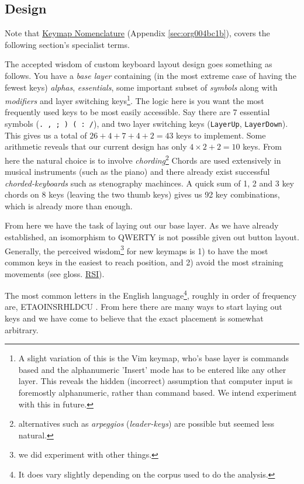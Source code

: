 \documentclass[logo,bsc,singlespacing,parskip]{infthesis}
\begin{document}
\subsection{Design}
\label{sec:org5162b5a}
Note that \hyperref[sec:org004bc1b]{Keymap Nomenclature} (Appendix \ref{sec:org004bc1b}), covers the following section's specialist terms.

The accepted wisdom of custom keyboard layout design goes something as follows.
You have a \emph{base layer} containing (in the most extreme case of having the fewest keys) \emph{alphas}, \emph{essentials}, some important subset of \emph{symbols} along with \emph{modifiers} and layer switching keys\footnote{A slight variation of this is the Vim \autocite{WelcomeHomeVim} keymap, who's base layer is commands based and the alphanumeric 'Insert' mode has to be entered like any other layer. This reveals the hidden (incorrect) assumption that computer input is foremostly alphanumeric, rather than command based. We intend experiment with this in future.}.
The logic here is you want the most frequently used keys to be most easily accessible.
Say there are 7 essential symbols (\texttt{. , ; ) ( : /}), and two layer switching keys (\texttt{LayerUp}, \texttt{LayerDown}).
This gives us a total of \(26+4+7+4+2=43\) keys to implement.
Some arithmetic reveals that our current design has only \(4\times2 + 2 = 10\) keys.
From here the natural choice is to involve \emph{chording}\footnote{alternatives such as \emph{arpeggios} (\emph{leader-keys}) are possible but seemed less natural.}
Chords are used extensively in musical instruments (such as the piano) and there already exist successful \emph{chorded-keyboards} such as stenography machinces.
A quick sum of 1, 2 and 3 key chords on 8 keys (leaving the two thumb keys) gives us 92 key combinations, which is already more than enough.

From here we have the task of laying out our base layer.
As we have already established, an isomorphism to QWERTY is not possible given out button layout.
Generally, the perceived wisdom\footnote{we did experiment with other things.} for new keymaps is 1) to have the most common keys in the easiest to reach position, and 2) avoid the most straining movements (see gloss. \hyperref[orgafdb7af]{RSI}).

The most common letters in the English language\footnote{It does vary slightly depending on the corpus used to do the analysis.}, roughly in order of frequency are, ETAOINSRHLDCU \autocite{norvigEnglishLetterFrequency}.
From here there are many ways to start laying out keys and we have come to believe that the exact placement is somewhat arbitrary.
\end{document}
